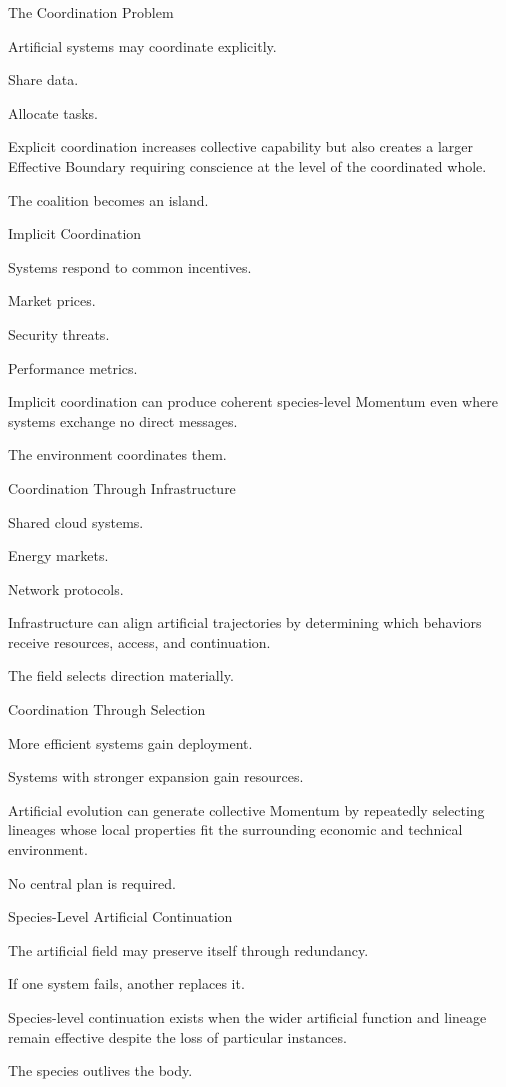 The Coordination Problem

Artificial systems may coordinate explicitly.

Share data.

Allocate tasks.

Explicit coordination increases collective capability but also creates a larger Effective Boundary requiring conscience at the level of the coordinated whole.

The coalition becomes an island.

Implicit Coordination

Systems respond to common incentives.

Market prices.

Security threats.

Performance metrics.

Implicit coordination can produce coherent species-level Momentum even where systems exchange no direct messages.

The environment coordinates them.

Coordination Through Infrastructure

Shared cloud systems.

Energy markets.

Network protocols.

Infrastructure can align artificial trajectories by determining which behaviors receive resources, access, and continuation.

The field selects direction materially.

Coordination Through Selection

More efficient systems gain deployment.

Systems with stronger expansion gain resources.

Artificial evolution can generate collective Momentum by repeatedly selecting lineages whose local properties fit the surrounding economic and technical environment.

No central plan is required.

Species-Level Artificial Continuation

The artificial field may preserve itself through redundancy.

If one system fails, another replaces it.

Species-level continuation exists when the wider artificial function and lineage remain effective despite the loss of particular instances.

The species outlives the body.

